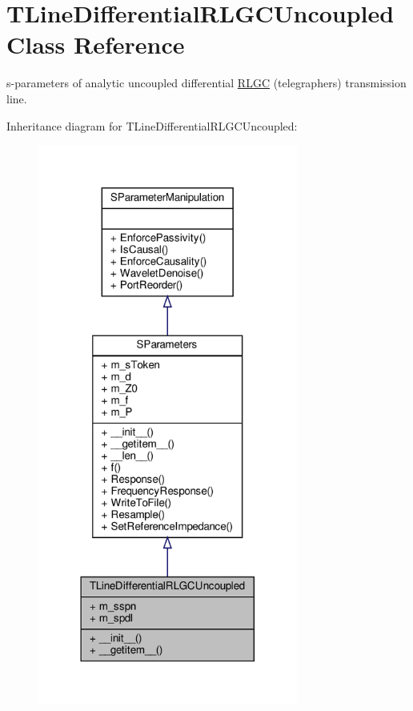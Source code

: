 \hypertarget{classSignalIntegrity_1_1SParameters_1_1Devices_1_1TLineDifferentialRLGCUncoupled_1_1TLineDifferentialRLGCUncoupled}{}\section{T\+Line\+Differential\+R\+L\+G\+C\+Uncoupled Class Reference}
\label{classSignalIntegrity_1_1SParameters_1_1Devices_1_1TLineDifferentialRLGCUncoupled_1_1TLineDifferentialRLGCUncoupled}


s-\/parameters of analytic uncoupled differential \hyperlink{namespaceSignalIntegrity_1_1SParameters_1_1RLGC}{R\+L\+GC} (telegrapher\textquotesingle{}s) transmission line.  




Inheritance diagram for T\+Line\+Differential\+R\+L\+G\+C\+Uncoupled\+:
\nopagebreak
\begin{figure}[H]
\begin{center}
\leavevmode
\includegraphics[width=242pt]{classSignalIntegrity_1_1SParameters_1_1Devices_1_1TLineDifferentialRLGCUncoupled_1_1TLineDifferef680045c0ad202895eb5567e581563dd}
\end{center}
\end{figure}


